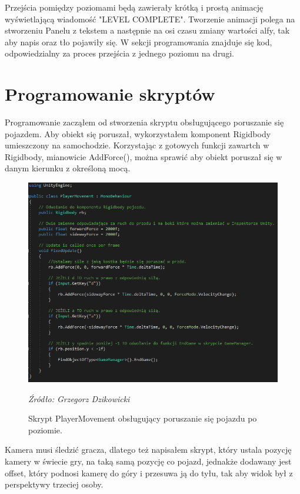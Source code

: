 \indent Przejścia pomiędzy poziomami będą zawierały krótką i prostą animację wyświetlającą wiadomość "LEVEL COMPLETE". Tworzenie animacji polega na stworzeniu Panelu z tekstem a następnie na osi czasu zmiany wartości alfy, tak aby napis oraz tło pojawiły się. W sekcji programowania znajduje się kod, odpowiedzialny za proces przejścia z jednego poziomu na drugi. 

\section{Programowanie skryptów}
\indent Programowanie zacząłem od stworzenia skryptu obsługującego poruszanie się pojazdem. Aby obiekt się poruszał, wykorzystałem komponent Rigidbody umieszczony na samochodzie. Korzystając z gotowych funkcji zawartch w Rigidbody, mianowicie AddForce(), można sprawić aby obiekt poruszał się w danym kierunku z określoną mocą.

\begin{figure}[!h]
\centering
  \includegraphics[width=1\linewidth]{playermove.png}
  \caption{Skrypt PlayerMovement obsługujący poruszanie się pojazdu po poziomie.}\label{rys_3}
  \begin{minipage}[t]{0.75\linewidth}
    \emph{Źródło: Grzegorz Dzikowicki}
  \end{minipage}
\end{figure}

\indent Kamera musi śledzić gracza, dlatego też napisałem skrypt, który ustala pozycję kamery w świecie gry, na taką samą pozycję co pojazd, jednakże dodawany jest offset, który podnosi kamerę do góry i przesuwa ją do tyłu, tak aby widok był z perspektywy trzeciej osoby.

